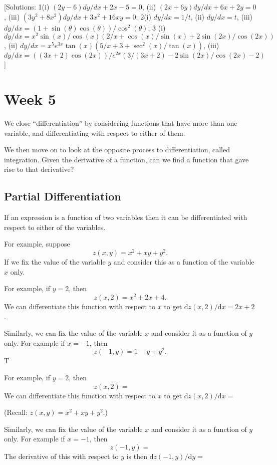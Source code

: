 \documentclass[
  11pt,
  oneside]{book}
\newcommand{\slide}{}
\theoremstyle{definition}
\theoremstyle{definition}
\theoremstyle{definition}
\theoremstyle{definition}
\theoremstyle{remark}
\begin{document}
{[}Solutions: 1(i) \((2y-6)dy/dx+2x-5=0\), (ii) \((2x+6y)dy/dx+6x+2y=0\), (iii) \((3y^2+8x^2)dy/dx+3x^2+16xy=0\); 2(i) \(dy/dx = 1/t\), (ii) \(dy/dx = t\), (iii) \(dy/dx = (1+\sin(\theta)\cos(\theta))/\cos^2(\theta)\); 3 (i) \(dy/dx=x^2\sin(x)/\cos(x)\left(2/x+\cos(x)/\sin(x)+2\sin(2x)/\cos(2x)\right)\), (ii) \(dy/dx = x^5e^{3x}\tan(x)\left(5/x+3+\sec^2(x)/\tan(x)\right)\), (iii) \(dy/dx = ((3x+2)\cos(2x))/e^{2x}\left(3/(3x+2)-2\sin(2x)/\cos(2x)-2\right)\){]}

\chapter{Week 5}\label{week-five}

We close ``differentiation'' by considering functions that have more than one variable, and differentiating with respect to either of them.

We then move on to look at the opposite process to differentiation, called integration. Given the derivative of a function, can we find a function that gave rise to that derivative?

\slide

\section{Partial Differentiation}\label{partial-differentiation}

If an expression is a function of two variables then it can be differentiated with respect to either of the variables.

For example, suppose
\[
z(x,y) = x^2+xy+y^2.
\]
If we fix the value of the variable \(y\) and consider this as a function of the variable \(x\) only.

\begin{notslides}

For example, if \(y=2\), then
\[
z(x,2) = x^2 + 2x + 4.
\]
We can differentiate this function with respect to \(x\) to get \(\mathrm{d}z(x,2)/\mathrm{d}x = 2x+2\).

Similarly, we can fix the value of the variable \(x\) and consider it as a function of \(y\) only. For example if \(x=-1\), then
\[
z(-1,y) = 1-y+y^2.
\]
T

\end{notslides}

\begin{slidesonly}

For example, if \(y=2\), then
\[
z(x,2) = \phantom{x^2 + 2x + 4.}
\]
We can differentiate this function with respect to \(x\) to get \(\mathrm{d}z(x,2)/\mathrm{d}x =\)

\slide

(Recall: \(z(x,y) = x^2+xy+y^2\).)

Similarly, we can fix the value of the variable \(x\) and consider it as a function of \(y\) only. For example if \(x=-1\), then
\[
z(-1,y) =
\]
The derivative of this with respect to \(y\) is then \(\mathrm{d}z(-1,y)/\mathrm{d}y =\)

\slide

\end{slidesonly}
\end{document}
